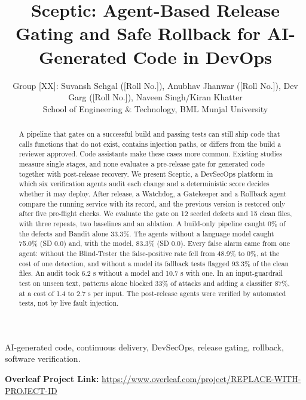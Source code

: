 \documentclass[12pt,onecolumn,draftclsnofoot]{IEEEtran}
\begin{document}
\title{Sceptic: Agent-Based Release Gating and Safe Rollback for AI-Generated Code in DevOps}
\author{Group [XX]: Suvansh Sehgal ([Roll No.]), Anubhav Jhanwar ([Roll No.]), Dev Garg ([Roll No.]), Naveen Singh/Kiran Khatter\\
School of Engineering \& Technology, BML Munjal University}
\maketitle
\begin{abstract}
A pipeline that gates on a successful build and passing tests can still ship code that calls functions that do not exist, contains injection paths, or differs from the build a reviewer approved. Code assistants make these cases more common. Existing studies measure single stages, and none evaluates a pre-release gate for generated code together with post-release recovery. We present Sceptic, a DevSecOps platform in which six verification agents audit each change and a deterministic score decides whether it may deploy. After release, a Watchdog, a Gatekeeper and a Rollback agent compare the running service with its record, and the previous version is restored only after five pre-flight checks. We evaluate the gate on 12 seeded defects and 15 clean files, with three repeats, two baselines and an ablation. A build-only pipeline caught 0\% of the defects and Bandit alone 33.3\%. The agents without a language model caught 75.0\% (SD 0.0) and, with the model, 83.3\% (SD 0.0). Every false alarm came from one agent: without the Blind-Tester the false-positive rate fell from 48.9\% to 0\%, at the cost of one detection, and without a model its fallback tests flagged 93.3\% of the clean files. An audit took 6.2 s without a model and 10.7 s with one. In an input-guardrail test on unseen text, patterns alone blocked 33\% of attacks and adding a classifier 87\%, at a cost of 1.4 to 2.7 s per input. The post-release agents were verified by automated tests, not by live fault injection.
\end{abstract}
\begin{IEEEkeywords}
AI-generated code, continuous delivery, DevSecOps, release gating, rollback, software verification.
\end{IEEEkeywords}
\noindent\textbf{Overleaf Project Link:} \url{https://www.overleaf.com/project/REPLACE-WITH-PROJECT-ID}
\end{document}
